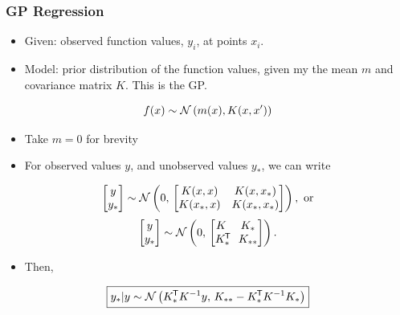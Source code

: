 \begin{frame} \frametitle{GP Regression}
\begin{itemize}
  \item Given: observed function values, $y_i$, at points $x_i$.
  \item Model: prior distribution of the function values,
    given my the mean $m$ and covariance matrix $K$.
    This is the GP.
\end{itemize}
\begin{equation}
  f(x) \sim \mathcal{N}\left(m(x),K(x,x')\right)
\end{equation}
  \vspace{-7mm}
\begin{itemize}
  \item Take $m = 0$ for brevity
  \item For observed values $y$, and unobserved values $y_*$, we can
    write
\end{itemize}
\begin{equation}
  \begin{bmatrix} y \\ y_* \end{bmatrix} \sim
  \mathcal{N}\left(0,\,\begin{bmatrix} K(x,x) & K(x,x_*) \\ K(x_*,x) & K(x_*,x_*) \end{bmatrix}\right),
  \ \text{or}
\end{equation}
\begin{equation}
  \begin{bmatrix} y \\ y_* \end{bmatrix} \sim
    \mathcal{N}\left(0,\,\begin{bmatrix} K & K_* \\ K_*^{\mkern-1.5mu\mathsf{T}}\!\! & K_{**} \end{bmatrix}\right).
\end{equation}
  \vspace{-4mm}
\begin{itemize}
  \item Then,
\end{itemize}
\begin{equation}
  \boxed{ y_*|y \sim \mathcal{N}\left(K_*^{\mkern-1.5mu\mathsf{T}} K^{-1}y,\,K_{**}-K_*^{\mkern-1.5mu\mathsf{T}} K^{-1}K_*\right) }
\end{equation}
\end{frame}

